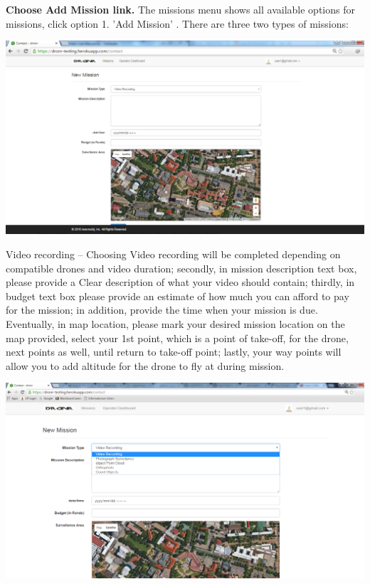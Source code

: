 \documentclass{article}
\begin{document}
\begin{useritems}
			
			\item {\bfseries Choose Add Mission link.} The missions menu shows all available options for missions, click option 1. 'Add Mission' .
			There are three two types of missions:
			
				
			\includegraphics[width=1\textwidth]{./image/AddMission.png}\\[0.4cm]			
			
			\item{Video recording} – Choosing Video recording will be completed depending on compatible drones and video duration; secondly, in mission description text box, please provide a 
			Clear description of what your video should contain; thirdly, in budget text box please provide an estimate of how much you can afford to pay for the mission; in addition, provide the time when your mission is due. Eventually, in map location, please mark your desired mission location on the map provided, select your 1st point, which is a point of take-off, for the drone, next points as well, until return to take-off point; lastly, your way points will allow you to add altitude for the drone to fly at during mission.  
			
			\includegraphics[width=1\textwidth]{./image/missiontypes.png}\\[0.4cm]
				

\end{useritems}
\end{document}

